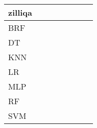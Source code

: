 \documentclass{article}
\begin{document}
{\begin{tabular}{|l|c|c|c|c|c|c|c|}
\hline
\textbf{zilliqa} \\ \hline
BRF & \cellcolor{gray}  & \cellcolor{white}  & \cellcolor{white}  & \cellcolor{black}  & \cellcolor{black}  & \cellcolor{white}  & \cellcolor{black}  \\ 
DT & \cellcolor{white}  & \cellcolor{gray}  & \cellcolor{white}  & \cellcolor{white}  & \cellcolor{black}  & \cellcolor{white}  & \cellcolor{white}  \\ 
KNN & \cellcolor{white}  & \cellcolor{white}  & \cellcolor{gray}  & \cellcolor{white}  & \cellcolor{white}  & \cellcolor{white}  & \cellcolor{white}  \\ 
LR & \cellcolor{white}  & \cellcolor{white}  & \cellcolor{white}  & \cellcolor{gray}  & \cellcolor{white}  & \cellcolor{white}  & \cellcolor{white}  \\ 
MLP & \cellcolor{white}  & \cellcolor{white}  & \cellcolor{white}  & \cellcolor{white}  & \cellcolor{gray}  & \cellcolor{white}  & \cellcolor{white}  \\ 
RF & \cellcolor{white}  & \cellcolor{white}  & \cellcolor{white}  & \cellcolor{white}  & \cellcolor{white}  & \cellcolor{gray}  & \cellcolor{white}  \\ 
SVM & \cellcolor{white}  & \cellcolor{white}  & \cellcolor{white}  & \cellcolor{white}  & \cellcolor{white}  & \cellcolor{white}  & \cellcolor{gray}  \\ 
\hline

\end{tabular}}
\end{document}
